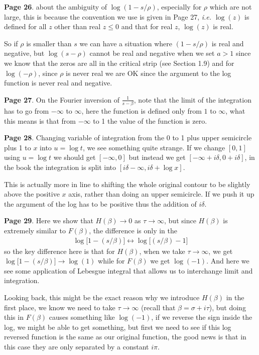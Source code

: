 \documentclass[aps,preprint,preprintnumbers,nofootinbib,showpacs,prd]{revtex4-1}
\newcommand{\ie}{{\it i.e.} }
\newcommand{\nbea}{\begin{eqnarray*}}
\newcommand{\neea}{\end{eqnarray*}}
\begin{document}
{\bf Page 26}. about the ambiguity of $\log(1 - s/\rho)$, especially for $\rho$ which are not large, this is because the convention we use is given in Page 27, \ie $\log(z)$ is defined for all $z$ other than real $z \le 0$ and that for real $z$, $\log(z)$ is real.

So if $\rho$ is smaller than $s$ we can have a situation where $(1 - s/\rho)$ is real and negative, but $\log(s-\rho)$ cannot be real and negative when we set $a > 1$ since we know that the zeros are all in the critical strip (see Section 1.9)  and for $\log(-\rho)$, since $\rho$ is never real we are OK since the argument to the log function is never real and negative.

{\bf Page 27}. On the Fourier inversion of $\frac{1}{s-\beta}$, note that the limit of the integration has to go from $-\infty$ to $\infty$, here the function is defined only from $1$ to $\infty$, what this means is that from $-\infty$ to 1 the value of the function is zero.

{\bf Page 28}. Changing variable of integration from the 0 to 1 plus upper semicircle plus 1 to $x$ into $u = \log t$, we see something quite strange. If we change $[0,1]$ using $u = \log t$ we should get $[-\infty,0]$ but instead we get $[-\infty + i\delta, 0 + i\delta]$, in the book the integration is split into $[i\delta-\infty,i\delta+\log x]$.

This is actually more in line to shifting the whole original contour to be slightly above the positive $x$ axis, rather than doing an upper semicircle. If we push it up the argument of the log has to be positive thus the addition of $i\delta$.

{\bf Page 29}. Here we show that $H(\beta)\to0$ as $\tau\to\infty$, but since $H(\beta)$ is extremely similar to $F(\beta)$, the difference is only in the 
%
\nbea
\log\lbrack 1 - (s/\beta)\rbrack \longleftrightarrow \log\lbrack (s/\beta) - 1 \rbrack 
\neea
%
so the key difference here is that for $H(\beta)$, when we take $\tau\to\infty$, we get $\log\lbrack 1 - (s/\beta)\rbrack \to \log(1)$ while for $F(\beta)$ we get $\log(-1)$. And here we see some application of Lebesgue integral that allows us to interchange limit and integration.

Looking back, this might be the exact reason why we introduce $H(\beta)$ in the first place, we know we need to take $\tau\to\infty$ (recall that $\beta = \sigma + i\tau$), but doing this in $F(\beta)$ causes something like $\log(-1)$, if we reverse the sign inside the log, we might be able to get something, but first we need to see if this log reversed function is the same as our original function, the good news is that in this case they are only separated by a constant $i\pi$.
\end{document}
